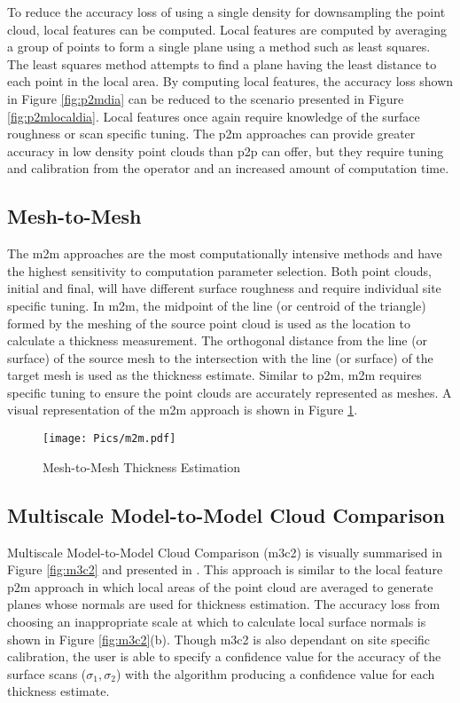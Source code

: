 To reduce the accuracy loss of using a single density for downsampling the point cloud, local features can be computed. Local features are computed by averaging a group of points to form a single plane using a method such as least squares. The least squares method attempts to find a plane having the least distance to each point in the local area. By computing local features, the accuracy loss shown in Figure \ref{fig:p2mdia} can be reduced to the scenario presented in Figure \ref{fig:p2mlocaldia}. Local features once again require knowledge of the surface roughness or scan specific tuning. The \acrshort{p2m} approaches can provide greater accuracy in low density point clouds than \acrshort{p2p} can offer, but they require tuning and calibration from the operator and an increased amount of computation time.\\
\subsection{Mesh-to-Mesh}
The \acrshort{m2m} approaches are the most computationally intensive methods and have the highest sensitivity to computation parameter selection. Both point clouds, initial and final, will have different surface roughness and require individual site specific tuning. In \acrshort{m2m}, the midpoint of the line (or centroid of the triangle) formed by the meshing of the source point cloud is used as the location to calculate a thickness measurement. The orthogonal distance from the line (or surface) of the source mesh to the intersection with the line (or surface) of the target mesh is used as the thickness estimate. Similar to \acrshort{p2m}, \acrshort{m2m} requires specific tuning to ensure the point clouds are accurately represented as meshes. A visual representation of the \acrshort{m2m} approach is shown in Figure \ref{fig:m2mdia}.\\
\begin{figure}[h!]
    \centering
    \texttt{[image: Pics/m2m.pdf]}
    \caption{Mesh-to-Mesh Thickness Estimation}
    \label{fig:m2mdia}
\end{figure}
\subsection{Multiscale Model-to-Model Cloud Comparison}

Multiscale Model-to-Model Cloud Comparison (\acrshort{m3c2}) is visually summarised in Figure \ref{fig:m3c2} and presented in \cite{thick2}. This approach is similar to the local feature \acrshort{p2m} approach in which local areas of the point cloud are averaged to generate planes whose normals are used for thickness estimation. The accuracy loss from choosing an inappropriate scale at which to calculate local surface normals is shown in Figure \ref{fig:m3c2}(b). Though \acrshort{m3c2} is also dependant on site specific calibration, the user is able to specify a confidence value for the accuracy of the surface scans ($\sigma_1,\sigma_2$) with the algorithm producing a confidence value for each thickness estimate.\\

